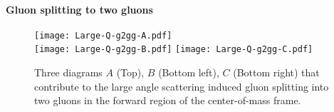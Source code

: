 \paragraph*{Gluon splitting to two gluons}
\begin{figure}
\centering
\texttt{[image: Large-Q-g2gg-A.pdf]}\\
\vspace{1em}
\texttt{[image: Large-Q-g2gg-B.pdf]}\hfill
\texttt{[image: Large-Q-g2gg-C.pdf]}
\caption{Three diagrams $A$ (Top), $B$ (Bottom left), $C$ (Bottom right) that contribute to the large angle scattering induced gluon splitting into two gluons in the forward region of the center-of-mass frame.}
\label{fig:feyn-g2gg}
\end{figure}

